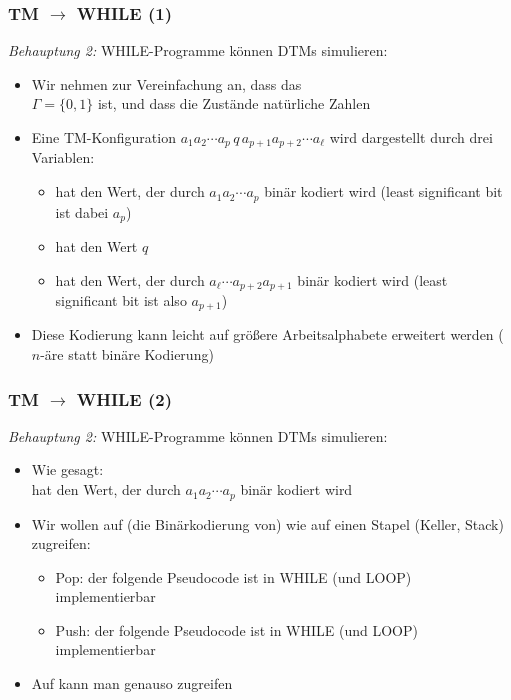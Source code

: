 \documentclass[onlymath]{beamer}
\begin{document}
\begin{frame}[t]\frametitle{TM $\to$ WHILE (1)}

\emph{Behauptung 2:} WHILE-Programme können DTMs simulieren:\pause
\medskip

\begin{itemize}
\item Wir nehmen zur Vereinfachung an, dass das \\
$\Gamma=\{0,1\}$ ist, und dass die Zustände natürliche Zahlen 
\item Eine TM-Konfiguration $a_1 a_2 \cdots a_p \,q\, a_{p+1}a_{p+2}\cdots a_{\ell}$ wird dargestellt durch drei Variablen:
\begin{itemize}
\item {} hat den Wert, der durch $a_1 a_2 \cdots a_p$ binär kodiert wird (least significant bit ist dabei $a_p$)
\item {} hat den Wert $q$
\item {} hat den Wert, der durch $a_{\ell} \cdots a_{p+2} a_{p+1}$ binär kodiert wird (least significant bit ist also $a_{p+1}$)
\end{itemize}
\item Diese Kodierung kann leicht auf größere Arbeitsalphabete erweitert werden ($n$-äre statt binäre Kodierung)
\end{itemize}

\end{frame}


\begin{frame}[t]\frametitle{TM $\to$ WHILE (2)}

\emph{Behauptung 2:} WHILE-Programme können DTMs simulieren:
\medskip

\begin{itemize}
\item Wie gesagt:\\
 hat den Wert, der durch $a_1 a_2 \cdots a_p$ binär kodiert wird \pause
\item Wir wollen auf (die Binärkodierung von)  wie auf einen \alert{Stapel} (Keller, Stack) zugreifen:\pause
\begin{itemize}
\item \alert{Pop:} der folgende Pseudocode ist in WHILE (und LOOP) implementierbar 
\pause
\item \alert{Push:} der folgende Pseudocode ist in WHILE (und LOOP) implementierbar 
\end{itemize}
\item Auf  kann man genauso zugreifen
\end{itemize}

\end{frame}
\end{document}
